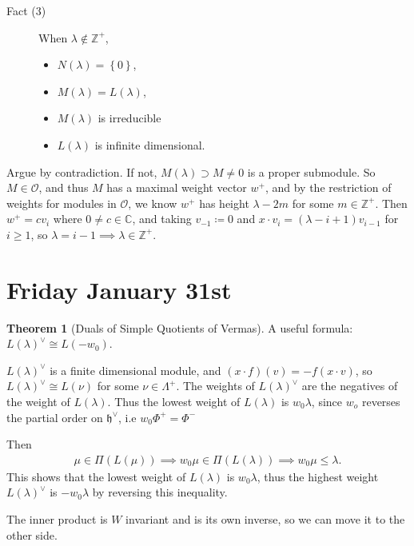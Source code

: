 \documentclass[11pt]{scrartcl}
\theoremstyle{definition}
\theoremstyle{theorem}
\newtheorem{theorem}{Theorem}[section]
\theoremstyle{proof}
\newenvironment{proof}
{\pushQED{$\qed$}\pf}
{\par\popQED\endpf}
\theoremstyle{definition}
\theoremstyle{break}
\theoremstyle{problem}
\providecommand{\tightlist}{%
  \setlength{\itemsep}{0pt}\setlength{\parskip}{0pt}}
\newcommand{\CC}[0]{{\mathbb{C}}}
\newcommand{\ZZ}[0]{{\mathbb{Z}}}
\newcommand{\definedas}[0]{\coloneqq}
\newcommand{\dual}[0]{^\vee}
\newcommand{\lieh}[0]{{\mathfrak{h}}}
\newcommand{\OO}[0]{{\mathcal{O}}}
\newcommand{\theset}[1]{\left\{{#1}\right\}}
\renewcommand{\qed}[0]{\hfill\blacksquare}
\begin{document}
\begin{description}
\item[Fact (3)]
When \(\lambda \not\in\ZZ^+\),

\begin{itemize}
\tightlist
\item
  \(N(\lambda) = \theset{0}\),
\item
  \(M(\lambda) = L(\lambda)\),
\item
  \(M(\lambda)\) is irreducible
\item
  \(L(\lambda)\) is infinite dimensional.
\end{itemize}
\end{description}

\begin{proof}

Argue by contradiction. If not, \(M(\lambda) \supset M \neq 0\) is a
proper submodule. So \(M\in \OO\), and thus \(M\) has a maximal weight
vector \(w^+\), and by the restriction of weights for modules in
\(\OO\), we know \(w^+\) has height \(\lambda - 2m\) for some
\(m\in \ZZ^+\). Then \(w^+ = c v_i\) where \(0\neq c \in \CC\), and
taking \(v_{-1} \definedas 0\) and
\(x\cdot v_i = (\lambda - i + 1)v_{i-1}\) for \(i\geq 1\), so
\(\lambda = i-1 \implies \lambda \in \ZZ^+\).\end{proof}

\hypertarget{friday-january-31st}{%
\section{Friday January 31st}\label{friday-january-31st}}

\begin{theorem}[Duals of Simple Quotients of Vermas]

A useful formula: \(L(\lambda)\dual \cong L(-w_0)\).\end{theorem}

\begin{proof}

\(L(\lambda)\dual\) is a finite dimensional module, and
\((x\cdot f)(v) = -f(x\cdot v)\), so \(L(\lambda)\dual \cong L(\nu)\)
for some \(\nu \in \Lambda^+\). The weights of \(L(\lambda)\dual\) are
the negatives of the weight of \(L(\lambda)\). Thus the lowest weight of
\(L(\lambda)\) is \(w_0\lambda\), since \(w_o\) reverses the partial
order on \(\lieh\dual\), i.e \(w_0 \Phi^+ = \Phi^-\)

Then
\begin{align*}
\mu \in \Pi(L(\mu)) \implies w_0 \mu \in \Pi(L(\lambda)) \implies w_0\mu \leq \lambda
.\end{align*} This shows that the lowest weight of \(L(\lambda)\) is
\(w_0 \lambda\), thus the highest weight \(L(\lambda)\dual\) is
\(-w_0 \lambda\) by reversing this inequality.

The inner product is \(W\) invariant and is its own inverse, so we can
move it to the other side.\end{proof}
\end{document}
